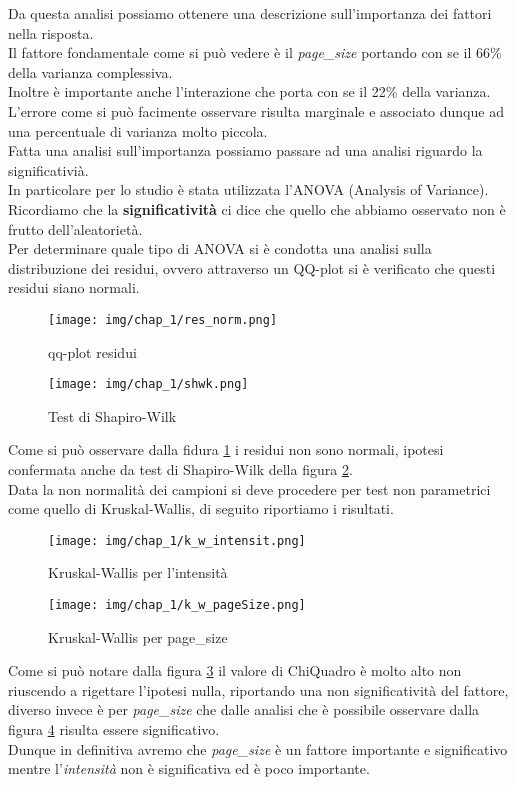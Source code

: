 Da questa analisi possiamo ottenere una descrizione sull'importanza dei fattori nella risposta.\\
Il fattore fondamentale come si può vedere è il \textit{page\_size} portando con se il 66\% della varianza complessiva.\\
Inoltre è importante anche l'interazione che porta con se il 22\% della varianza.\\
L'errore come si può facimente osservare risulta marginale e associato dunque ad una percentuale di varianza molto piccola.\\
Fatta una analisi sull'importanza possiamo passare ad una analisi riguardo la significativià.\\
In particolare per lo studio è stata utilizzata l'ANOVA (Analysis of Variance).\\
Ricordiamo che la \textbf{significatività} ci dice che quello che abbiamo osservato non è frutto dell'aleatorietà.\\
Per determinare quale tipo di ANOVA si è condotta una analisi sulla distribuzione dei residui, ovvero attraverso un QQ-plot si è verificato che questi residui siano normali.\\
\begin{figure}[H]
    \centering
    \texttt{[image: img/chap\_1/res\_norm.png]}
    \caption{qq-plot residui}
    \label{fig:qq_res_plot}
\end{figure}
\begin{figure}[H]
    \centering
    \texttt{[image: img/chap\_1/shwk.png]}
    \caption{Test di Shapiro-Wilk}
    \label{fig:shapWilk}
\end{figure}
\noindent
Come si può osservare dalla fidura \ref{fig:qq_res_plot} i residui non sono normali, ipotesi confermata anche da test di Shapiro-Wilk della figura \ref{fig:shapWilk}.\\
Data la non normalità dei campioni si deve procedere per test non parametrici come quello di Kruskal-Wallis, di seguito riportiamo i risultati.\\
\begin{figure}[H]
    \centering
    \texttt{[image: img/chap\_1/k\_w\_intensit.png]}
    \caption{Kruskal-Wallis per l'intensità}
    \label{fig:k_w_int}
\end{figure}
\begin{figure}[H]
    \centering
    \texttt{[image: img/chap\_1/k\_w\_pageSize.png]}
    \caption{Kruskal-Wallis per page\_size}
    \label{fig:k_w_ps}
\end{figure}
\noindent
Come si può notare dalla figura \ref{fig:k_w_int} il valore di ChiQuadro è molto alto non riuscendo a rigettare l'ipotesi nulla, riportando una non significatività del fattore, diverso invece è per \textit{page\_size} che dalle analisi che è possibile osservare dalla figura \ref{fig:k_w_ps} risulta essere significativo.\\
Dunque in definitiva avremo che \textit{page\_size} è un fattore importante e significativo mentre l'\textit{intensità} non è significativa ed è poco importante.\\ 


  